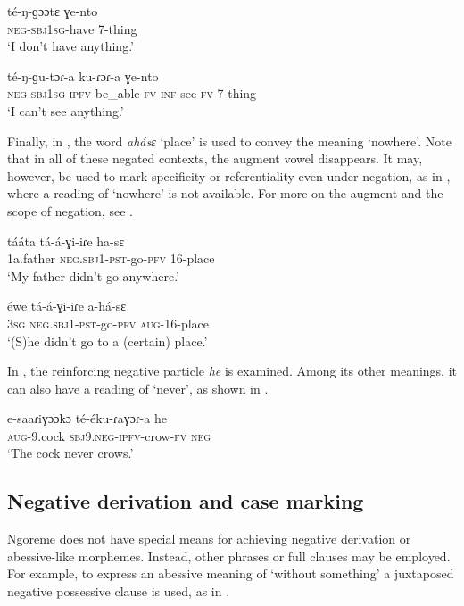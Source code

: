 \documentclass[output=paper,colorlinks,citecolor=brown,draftmode]{langscibook}
\begin{document}
\ea\label{ex:ngo:70} 
    \gll té{}-ŋ{}-ɡɔɔtɛ ɣe{}-nto\\ 
        \textsc{neg-sbj1sg}{}-have 7-thing \\
    \glt  ‘I don’t have anything.’
\z 

\ea\label{ex:ngo:71} 
    \gll té{}-ŋ{}-ɡu-tɔɾ{}-a ku-ɾɔɾ{}-a ɣe-nto \\ 
         \textsc{neg-sbj1sg-ipfv}{}-be\_able-\textsc{fv} \textsc{inf}{}-see-\textsc{fv} 7-thing\\
    \glt ‘I can’t see anything.’
\z 

Finally, in , the word \textit{ahásɛ} ‘place’ is used to convey the meaning ‘nowhere’. Note that in all of these negated contexts, the augment vowel disappears. It may, however, be used to mark specificity or referentiality even under negation, as in , where a reading of ‘nowhere’ is not available. For more on the augment and the scope of negation, see .

\ea\label{ex:ngo:72} 
    \gll tááta tá-á-ɣi-iɾe ha-sɛ\\ 
        1a.father \textsc{neg.sbj1{}-pst}{}-go-\textsc{pfv} \textsc{16-}place\\
    \glt ‘My father didn’t go anywhere.’
\z 

\ea\label{ex:ngo:73} 
    \gll éwe tá{}-á{}-ɣi{}-iɾe a{}-há{}-sɛ\\ 
        3\textsc{sg} \textsc{neg.sbj1-pst}{}-go-\textsc{pfv} \textsc{aug-}16-place\\
    \glt ‘(S)he didn’t go to a (certain) place.’
\z 

In , the reinforcing negative particle \textit{he} is examined. Among its other meanings, it can also have a reading of ‘never’, as shown in .

\ea\label{ex:ngo:74} 
    \gll e{}-saaɾiɣɔɔkɔ té{}-éku{}-ɾaɣɔɾ-a he\\ 
        \textsc{aug-}9.cock \textsc{sbj}9.\textsc{neg-ipfv}{}-crow-\textsc{fv} \textsc{neg}\\
    \glt ‘The cock never crows.’
\z 

\subsection{Negative derivation and case marking}\label{sec:ngo:3.3}

Ngoreme does not have special means for achieving negative derivation or abes\-sive-like morphemes. Instead, other phrases or full clauses may be employed. For example, to express an abessive meaning of ‘without something’ a juxtaposed negative possessive clause is used, as in .
\end{document}
